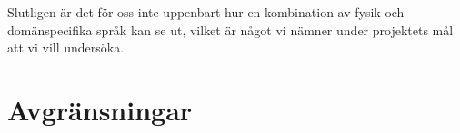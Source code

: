 \begin{draft}
Slutligen är det för oss inte uppenbart hur en kombination av fysik och domänspecifika språk kan se ut,
vilket är något vi nämner under projektets mål att vi vill undersöka.

\fi


\end{draft}


\section{Avgränsningar}


